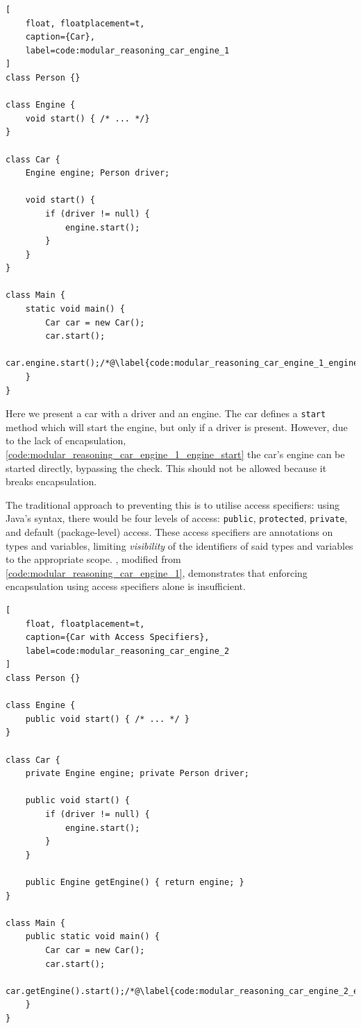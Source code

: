 \documentclass{acm_proc_article-sp}
\begin{document}
\begin{lstlisting}[
	float, floatplacement=t,
	caption={Car},
	label=code:modular_reasoning_car_engine_1
]
class Person {}

class Engine {
	void start() { /* ... */}
}

class Car {
	Engine engine; Person driver;

	void start() {
		if (driver != null) {
			engine.start();
		}
	}
}

class Main {
	static void main() {
		Car car = new Car();
		car.start();
		car.engine.start();/*@\label{code:modular_reasoning_car_engine_1_engine_start}@*/
	}
}
\end{lstlisting}

Here we present a car with a driver and an engine. The car defines a
\lstinline|start| method which will start the engine, but only if a driver is
present. However, due to the lack of encapsulation,
\cref{code:modular_reasoning_car_engine_1_engine_start} the car's engine can be
started directly, bypassing the check. This should not be allowed because
it breaks encapsulation.

The traditional approach to preventing this is to utilise access specifiers:
using Java's syntax, there would be four levels of access: \lstinline|public|,
\lstinline|protected|, \lstinline|private|, and default (package-level) access.
These access specifiers are annotations on types and variables, limiting
\emph{visibility} of the identifiers of said types and variables to the
appropriate scope. , modified from
\cref{code:modular_reasoning_car_engine_1}, demonstrates that enforcing
encapsulation using access specifiers alone is insufficient.

\begin{lstlisting}[
	float, floatplacement=t,
	caption={Car with Access Specifiers},
	label=code:modular_reasoning_car_engine_2
]
class Person {}

class Engine {
	public void start() { /* ... */ }
}

class Car {
	private Engine engine; private Person driver;

	public void start() {
		if (driver != null) {
			engine.start();
		}
	}

	public Engine getEngine() { return engine; }
}

class Main {
	public static void main() {
		Car car = new Car();
		car.start();
		car.getEngine().start();/*@\label{code:modular_reasoning_car_engine_2_engine_start}@*/
	}
}

\end{lstlisting}
\end{document}
